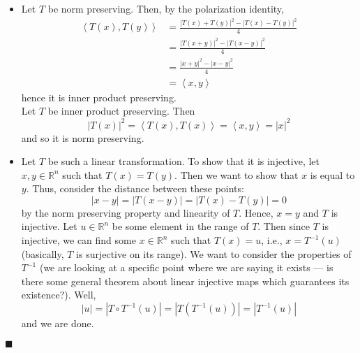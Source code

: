 \documentclass[12pt]{article}
\renewcommand{\qed}{\hfill$\blacksquare$}
\renewenvironment{proof}{\begin{addmargin}[1em]{0em}\begin{newproof}}{\end{newproof}\end{addmargin}\qed}
\begin{document}
\begin{proof}
\begin{itemize}
	\item Let $T$ be norm preserving. Then, by the polarization identity,
	\begin{equation*}
	\begin{split}
	\left\langle T\left(x\right), T\left(y\right) \right\rangle & = \frac{\left|T\left(x\right) + T\left(y\right) \right|^2 - \left|T\left(x\right)-T\left(y\right)\right|^2 }{4} \\
	& = \frac{\left| T\left(x+y\right)\right|^2 - \left| T\left(x-y\right)\right|^2}{4} \\
	& = \frac{\left| x+y\right|^2 - \left|x-y\right|^2}{4}  \\
	& = \left\langle x,y\right\rangle 
	\end{split} 
	\end{equation*}
	hence it is inner product preserving. \\
	Let $T$ be inner product preserving. Then
	$$ \left|T\left(x\right)\right|^2 = \left\langle T\left(x\right), T\left(x\right) \right\rangle = \left\langle x, y\right\rangle = \left|x\right|^2 $$ and so it is norm preserving. \\
	\item Let $T$ be such a linear transformation. To show that it is injective, let $x,y\in \mathbb{R}^n$ such that $T\left(x\right) = T\left(y\right)$. Then we want to show that $x$ is equal to $y$. Thus, consider the distance between these points:
	$$ \left|x-y\right| = \left| T\left(x-y\right) \right| = \left|T\left(x\right) - T\left(y\right) \right| = 0$$
	by the norm preserving property and linearity of $T$. Hence, $x=y$ and $T$ is injective. Let $u\in \mathbb{R}^n$ be some element in the range of $T$. Then since $T$ is injective, we can find some $x\in\mathbb{R}^n$ such that $T\left(x\right) = u$, i.e., $x = T^{-1}\left(u\right)$ (basically, $T$ is surjective on its range). We want to consider the properties of $T^{-1}$ (we are looking at a specific point where we are saying it exists --- is there some general theorem about linear injective maps which guarantees its existence?). Well,
	$$ \left| u \right| = \left| T \circ T^{-1} \left(u\right) \right| = \left| T \left(T^{-1}\left(u\right)\right) \right| = \left| T^{-1}\left(u\right) \right| $$ and we are done.
\end{itemize}
\end{proof}
\end{document}
